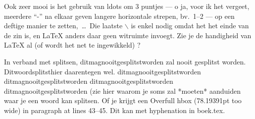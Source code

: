 Ook zeer mooi is het gebruik van ldots om 3 puntjes --- o ja, voor ik het vergeet, meerdere ``-'' na elkaar geven langere horizontale strepen, bv.\ 1--2 --- op een
deftige manier te zetten,~\ldots\ Die laatste $\backslash$ is enkel nodig omdat het het einde van de zin is, en LaTeX anders daar geen witruimte
invoegt. Zie je de handigheid van LaTeX al (of wordt het net te ingewikkeld) ?

In verband met splitsen, ditmagnooitgesplitstworden zal nooit gesplitst worden. Ditwoordsplitsthier daarentegen wel. ditmagnooitgesplitstworden
ditmagnooitgesplitstworden ditmagnooitgesplitstworden ditmagnooitgesplitstworden (zie hier waarom je soms zal *moeten* aanduiden waar je een woord kan
splitsen. Of je krijgt een Overfull hbox (78.19391pt too wide) in paragraph at lines 43--45. Dit kan met hyphenation in boek.tex.







